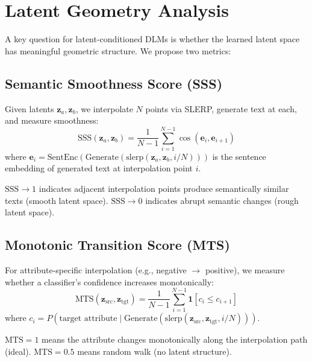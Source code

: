\documentclass{article}
\begin{document}
\section{Latent Geometry Analysis}
\label{sec:geometry}

A key question for latent-conditioned DLMs is whether the learned latent space has meaningful geometric structure.
We propose two metrics:

\subsection{Semantic Smoothness Score (SSS)}

Given latents $\mathbf{z}_a, \mathbf{z}_b$, we interpolate $N$ points via SLERP, generate text at each, and measure smoothness:
\begin{equation}
    \text{SSS}(\mathbf{z}_a, \mathbf{z}_b) = \frac{1}{N-1} \sum_{i=1}^{N-1} \cos\left(\mathbf{e}_i, \mathbf{e}_{i+1}\right)
\end{equation}
where $\mathbf{e}_i = \text{SentEnc}(\text{Generate}(\text{slerp}(\mathbf{z}_a, \mathbf{z}_b, i/N)))$ is the sentence embedding of generated text at interpolation point $i$.

$\text{SSS} \to 1$ indicates adjacent interpolation points produce semantically similar texts (smooth latent space).
$\text{SSS} \to 0$ indicates abrupt semantic changes (rough latent space).

\subsection{Monotonic Transition Score (MTS)}

For attribute-specific interpolation (e.g., negative $\to$ positive), we measure whether a classifier's confidence increases monotonically:
\begin{equation}
    \text{MTS}(\mathbf{z}_\text{src}, \mathbf{z}_\text{tgt}) = \frac{1}{N-1} \sum_{i=1}^{N-1} \mathbf{1}\left[c_i \leq c_{i+1}\right]
\end{equation}
where $c_i = P(\text{target attribute} \mid \text{Generate}(\text{slerp}(\mathbf{z}_\text{src}, \mathbf{z}_\text{tgt}, i/N)))$.

$\text{MTS} = 1$ means the attribute changes monotonically along the interpolation path (ideal).
$\text{MTS} = 0.5$ means random walk (no latent structure).
\end{document}
